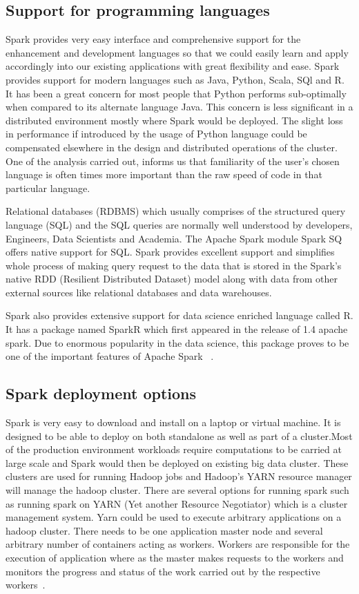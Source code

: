 \subsection{Support for programming languages}
Spark provides very easy interface and comprehensive support for the enhancement
 and development languages so that we could easily learn and apply accordingly 
 into our existing applications with great flexibility and ease.
Spark provides support for modern languages such as Java, Python, Scala, SQl and
 R. It has been a great concern for most people that Python performs 
 sub-optimally when compared to its alternate language Java. This concern is 
 less significant in a distributed environment mostly where Spark would be 
 deployed. The slight loss in performance if introduced by the usage of Python 
 language could be compensated elsewhere in the design and distributed 
 operations of the cluster. One of the analysis carried out, informs us that 
 familiarity of the user's chosen language is often times more important than 
 the raw speed of code in that particular language.

Relational databases (RDBMS) which usually comprises of the structured query 
language (SQL) and the SQL queries are normally well understood by developers, 
Engineers, Data Scientists and Academia. The Apache Spark module Spark SQ 
offers native support for SQL. Spark provides excellent support and simplifies 
whole process of making query request to the data that is stored in the Spark's 
native RDD (Resilient Distributed Dataset) model along with data from other 
external sources like relational databases and data warehouses.
 
Spark also provides extensive support for data science enriched language called 
R. It has a package named SparkR which first appeared in the release of 1.4 
apache spark. Due to enormous popularity in the data science, this package 
proves to be one of the important features of Apache Spark
~\cite{hid-sp18-410-spark-architecture}.

\subsection{Spark deployment options}
Spark is very easy to download and install on a laptop or virtual machine. 
It is designed to be able to deploy on both standalone as well as part of a 
cluster.Most of the production environment workloads require computations to 
be carried at large scale and Spark would then be deployed on existing big data 
cluster. These clusters are used for running Hadoop jobs and Hadoop's YARN 
resource manager will manage the hadoop cluster. There are several options for 
running  spark such as running spark on YARN (Yet another Resource Negotiator) 
which is a cluster management system.
Yarn could be used to execute arbitrary applications on a hadoop cluster. 
There needs to be one application master node and several arbitrary number of 
containers acting as workers. Workers are responsible for the execution of 
application where as the master makes requests to the workers and monitors the 
progress and status of the work carried out by the 
respective workers~\cite{hid-sp18-410-spark-architecture}.

